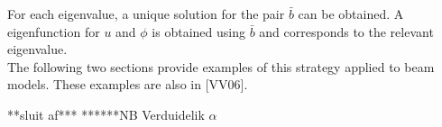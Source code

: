 \documentclass[../../main.tex]{subfiles}
\begin{document}
 For each eigenvalue, a unique solution for the pair $\bar{b}$ can be obtained. A eigenfunction for $u$ and $\phi$ is obtained using $\bar{b}$ and corresponds to the relevant eigenvalue.\\

The following two sections provide examples of this strategy applied to beam models. These examples are also in [VV06].

**sluit af***
******NB Verduidelik $\alpha$
\end{document}
